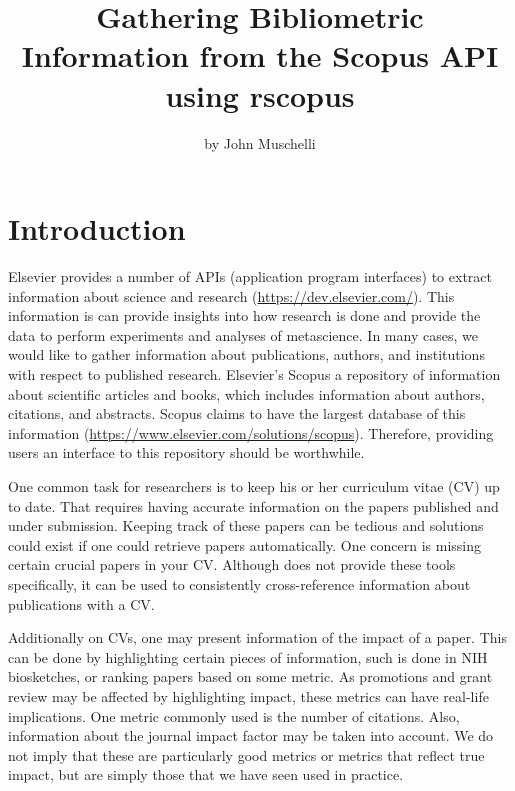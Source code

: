\title{Gathering Bibliometric Information from the Scopus API using rscopus}
\author{by John Muschelli}

\maketitle



\hypertarget{introduction}{%
\section{Introduction}\label{introduction}}

Elsevier provides a number of APIs (application program interfaces) to
extract information about science and research
(\url{https://dev.elsevier.com/}). This information is can provide
insights into how research is done and provide the data to perform
experiments and analyses of metascience. In many cases, we would like to
gather information about publications, authors, and institutions with
respect to published research. Elsevier's Scopus a repository of
information about scientific articles and books, which includes
information about authors, citations, and abstracts. Scopus claims to
have the largest database of this information
(\url{https://www.elsevier.com/solutions/scopus}). Therefore, providing
users an interface to this repository should be worthwhile.

One common task for researchers is to keep his or her curriculum vitae
(CV) up to date. That requires having accurate information on the papers
published and under submission. Keeping track of these papers can be
tedious and solutions could exist if one could retrieve papers
automatically. One concern is missing certain crucial papers in your CV.
Although  does not provide these tools specifically, it
can be used to consistently cross-reference information about
publications with a CV.

Additionally on CVs, one may present information of the impact of a
paper. This can be done by highlighting certain pieces of information,
such is done in NIH biosketches, or ranking papers based on some metric.
As promotions and grant review may be affected by highlighting impact,
these metrics can have real-life implications. One metric commonly used
is the number of citations. Also, information about the journal impact
factor may be taken into account. We do not imply that these are
particularly good metrics or metrics that reflect true impact, but are
simply those that we have seen used in practice.\\

